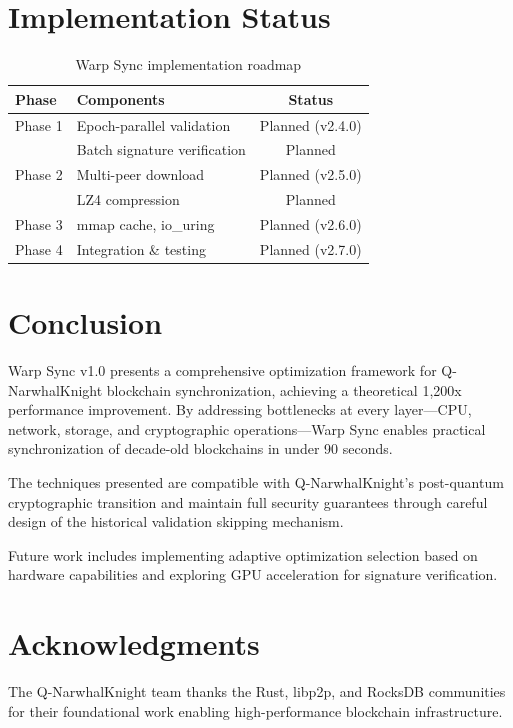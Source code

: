 \documentclass[11pt,a4paper]{article}
\begin{document}
\section{Implementation Status}

\begin{table}[h]
\centering
\begin{tabular}{llc}
\toprule
\textbf{Phase} & \textbf{Components} & \textbf{Status} \\
\midrule
Phase 1 & Epoch-parallel validation & Planned (v2.4.0) \\
 & Batch signature verification & Planned \\
Phase 2 & Multi-peer download & Planned (v2.5.0) \\
 & LZ4 compression & Planned \\
Phase 3 & mmap cache, io\_uring & Planned (v2.6.0) \\
Phase 4 & Integration \& testing & Planned (v2.7.0) \\
\bottomrule
\end{tabular}
\caption{Warp Sync implementation roadmap}
\end{table}

\section{Conclusion}

Warp Sync v1.0 presents a comprehensive optimization framework for Q-NarwhalKnight blockchain synchronization, achieving a theoretical 1,200x performance improvement. By addressing bottlenecks at every layer—CPU, network, storage, and cryptographic operations—Warp Sync enables practical synchronization of decade-old blockchains in under 90 seconds.

The techniques presented are compatible with Q-NarwhalKnight's post-quantum cryptographic transition and maintain full security guarantees through careful design of the historical validation skipping mechanism.

Future work includes implementing adaptive optimization selection based on hardware capabilities and exploring GPU acceleration for signature verification.

\section*{Acknowledgments}

The Q-NarwhalKnight team thanks the Rust, libp2p, and RocksDB communities for their foundational work enabling high-performance blockchain infrastructure.
\end{document}
